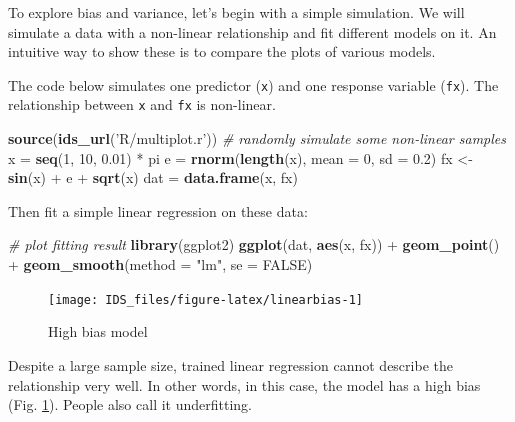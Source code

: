\documentclass[12pt,]{krantz}
\newenvironment{Shaded}{\begin{snugshade}}{\end{snugshade}}
\newcommand{\KeywordTok}[1]{\textcolor[rgb]{0.13,0.29,0.53}{\textbf{{#1}}}}
\newcommand{\DataTypeTok}[1]{\textcolor[rgb]{0.13,0.29,0.53}{{#1}}}
\newcommand{\DecValTok}[1]{\textcolor[rgb]{0.00,0.00,0.81}{{#1}}}
\newcommand{\FloatTok}[1]{\textcolor[rgb]{0.00,0.00,0.81}{{#1}}}
\newcommand{\StringTok}[1]{\textcolor[rgb]{0.31,0.60,0.02}{{#1}}}
\newcommand{\CommentTok}[1]{\textcolor[rgb]{0.56,0.35,0.01}{\textit{{#1}}}}
\newcommand{\OtherTok}[1]{\textcolor[rgb]{0.56,0.35,0.01}{{#1}}}
\newcommand{\NormalTok}[1]{{#1}}
\theoremstyle{definition}
\theoremstyle{definition}
\theoremstyle{remark}
\begin{document}
To explore bias and variance, let's begin with a simple simulation. We
will simulate a data with a non-linear relationship and fit different
models on it. An intuitive way to show these is to compare the plots of
various models.

The code below simulates one predictor (\texttt{x}) and one response
variable (\texttt{fx}). The relationship between \texttt{x} and
\texttt{fx} is non-linear.

\begin{Shaded}
\begin{Highlighting}[]
\KeywordTok{source}\NormalTok{(}\KeywordTok{ids_url}\NormalTok{(}\StringTok{'R/multiplot.r'}\NormalTok{))}
\CommentTok{# randomly simulate some non-linear samples}
\NormalTok{x =}\StringTok{ }\KeywordTok{seq}\NormalTok{(}\DecValTok{1}\NormalTok{, }\DecValTok{10}\NormalTok{, }\FloatTok{0.01}\NormalTok{) *}\StringTok{ }\NormalTok{pi}
\NormalTok{e =}\StringTok{ }\KeywordTok{rnorm}\NormalTok{(}\KeywordTok{length}\NormalTok{(x), }\DataTypeTok{mean =} \DecValTok{0}\NormalTok{, }\DataTypeTok{sd =} \FloatTok{0.2}\NormalTok{)}
\NormalTok{fx <-}\StringTok{ }\KeywordTok{sin}\NormalTok{(x) +}\StringTok{ }\NormalTok{e +}\StringTok{ }\KeywordTok{sqrt}\NormalTok{(x)}
\NormalTok{dat =}\StringTok{ }\KeywordTok{data.frame}\NormalTok{(x, fx)}
\end{Highlighting}
\end{Shaded}

Then fit a simple linear regression on these data:

\begin{Shaded}
\begin{Highlighting}[]
\CommentTok{# plot fitting result}
\KeywordTok{library}\NormalTok{(ggplot2)}
\KeywordTok{ggplot}\NormalTok{(dat, }\KeywordTok{aes}\NormalTok{(x, fx)) +}\StringTok{ }\KeywordTok{geom_point}\NormalTok{() +}\StringTok{ }\KeywordTok{geom_smooth}\NormalTok{(}\DataTypeTok{method =} \StringTok{"lm"}\NormalTok{, }\DataTypeTok{se =} \OtherTok{FALSE}\NormalTok{)}
\end{Highlighting}
\end{Shaded}

\begin{figure}

{\centering \texttt{[image: IDS\_files/figure-latex/linearbias-1]} 

}

\caption{High bias model}\label{fig:linearbias}
\end{figure}

Despite a large sample size, trained linear regression cannot describe
the relationship very well. In other words, in this case, the model has
a high bias (Fig. \ref{fig:linearbias}). People also call it
underfitting.
\end{document}
